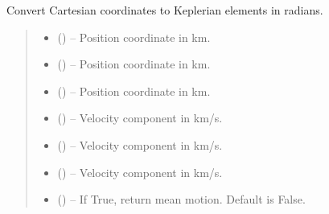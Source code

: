 \documentclass[letterpaper,10pt,english]{sphinxmanual}
\begin{document}
\begin{fulllineitems}
\label{\detokenize{fspsim.utils:fspsim.utils.Conversions.car2kep}}
\pysigstartsignatures
{}
\pysigstopsignatures
\sphinxAtStartPar
Convert Cartesian coordinates to Keplerian elements in radians.
\begin{quote}\begin{description}
\begin{itemize}
\item {} 
\sphinxAtStartPar
{} () – Position coordinate in km.

\item {} 
\sphinxAtStartPar
{} () – Position coordinate in km.

\item {} 
\sphinxAtStartPar
{} () – Position coordinate in km.

\item {} 
\sphinxAtStartPar
{} () – Velocity component in km/s.

\item {} 
\sphinxAtStartPar
{} () – Velocity component in km/s.

\item {} 
\sphinxAtStartPar
{} () – Velocity component in km/s.

\item {} 
\sphinxAtStartPar
{} () – If True, return mean motion. Default is False.


\end{itemize}
\end{description}
\end{quote}
\end{fulllineitems}
\end{document}
